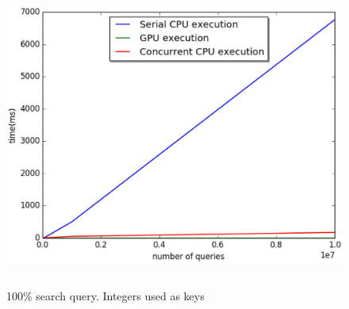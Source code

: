 \documentclass[MTech]{iitmdiss}
\begin{document}
\begin{figure}[H]
\centering 
\includegraphics[width=13cm,height=10cm]{s_i_d_100_0_0}
\caption{100\% search query. Integers used as keys}
\label{fig:sid_100_0_0}
\end{figure}
\end{document}
